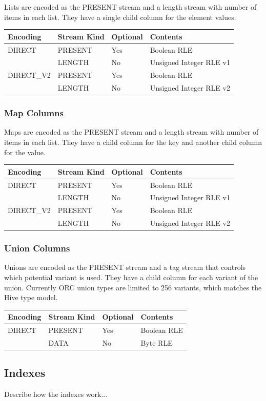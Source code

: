 \documentclass{article}
\begin{document}
Lists are encoded as the PRESENT stream and a length stream with
number of items in each list. They have a single child column for the
element values.

\vspace{10pt}
\begin{tabular}{| l | l | l | l |}
\hline
Encoding & Stream Kind & Optional & Contents \\
\hline
DIRECT & PRESENT & Yes & Boolean RLE\\
       & LENGTH  & No  & Unsigned Integer RLE v1\\
\hline
DIRECT\_V2 & PRESENT & Yes & Boolean RLE\\
           & LENGTH  & No  & Unsigned Integer RLE v2\\
\hline
\end{tabular}

\subsubsection{Map Columns}

Maps are encoded as the PRESENT stream and a length stream with number
of items in each list. They have a child column for the key and
another child column for the value.

\vspace{10pt}
\begin{tabular}{| l | l | l | l |}
\hline
Encoding & Stream Kind & Optional & Contents \\
\hline
DIRECT & PRESENT & Yes & Boolean RLE\\
       & LENGTH  & No  & Unsigned Integer RLE v1\\
\hline
DIRECT\_V2 & PRESENT & Yes & Boolean RLE\\
           & LENGTH  & No  & Unsigned Integer RLE v2\\
\hline
\end{tabular}

\subsubsection{Union Columns}

Unions are encoded as the PRESENT stream and a tag stream that controls which
potential variant is used. They have a child column for each variant of the
union. Currently ORC union types are limited to 256 variants, which matches 
the Hive type model.

\vspace{10pt}
\begin{tabular}{| l | l | l | l |}
\hline
Encoding & Stream Kind & Optional & Contents \\
\hline
DIRECT & PRESENT & Yes & Boolean RLE\\
       & DATA    & No  & Byte RLE\\
\hline
\end{tabular}

\subsection{Indexes}

Describe how the indexes work...
\end{document}
